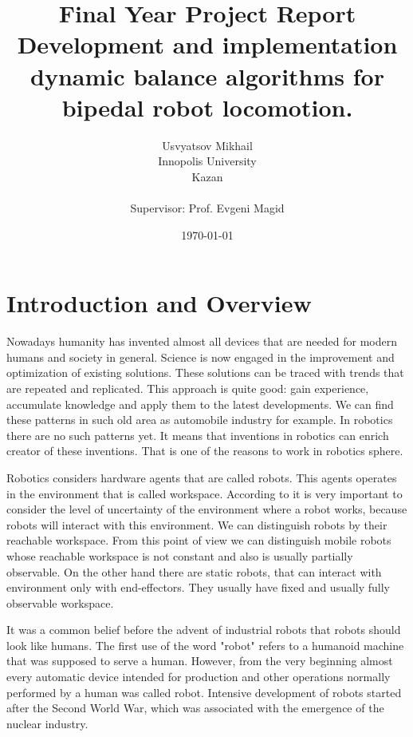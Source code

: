 \documentclass[12pt,a4paper]{report}
\begin{document}
	
	\title{Final Year Project Report\\ Development and implementation dynamic balance algorithms for bipedal robot locomotion.}
	\author{Usvyatsov Mikhail\\Innopolis University\\Kazan\\  ~\\ \normalsize Supervisor: Prof. Evgeni Magid}
	\date{\normalsize \today}
	\maketitle
	
	\tableofcontents
	
	\newpage

	\chapter{Introduction and Overview}
		Nowadays humanity has invented almost all devices that are needed for modern humans and society in general. Science is now engaged in the improvement and optimization of existing solutions. These solutions can be traced with trends that are repeated and replicated. This approach is quite good: gain experience, accumulate knowledge and apply them to the latest developments. We can find these patterns in such old area as automobile industry for example. In robotics there are no such patterns yet. It means that inventions in robotics can enrich creator of these inventions. That is one of the reasons to work in robotics sphere.
		
		Robotics considers hardware agents that are called robots. This agents operates in the environment that is called workspace. According to \cite{pfeifer2007self} it is very important to consider the level of uncertainty of the environment where a robot works, because robots will interact with this environment. We can distinguish robots by their reachable workspace. From this point of view we can distinguish mobile robots whose reachable workspace is not constant and also is usually partially observable. On the other hand there are static robots, that can interact with environment only with end-effectors. They usually have fixed and usually fully observable workspace.
		
		It was a common belief before the advent of industrial robots that robots should look like humans. The first use of the word "robot" refers to a humanoid machine that was supposed to serve a human. However, from the very beginning almost every automatic device intended for production and other operations normally performed by a human was called robot. Intensive development of robots started after the Second World War, which was associated with the emergence of the nuclear industry.
		
\end{document}
